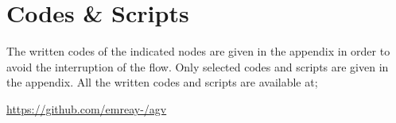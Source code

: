 \chapter{Codes \& Scripts}
\label{appendix}

The written codes of the indicated nodes are given in the appendix in order to avoid the interruption of the flow. Only selected codes and scripts are given in the appendix. All the written codes and scripts are available at;
\par
\centering
\url{https://github.com/emreay-/agv}






